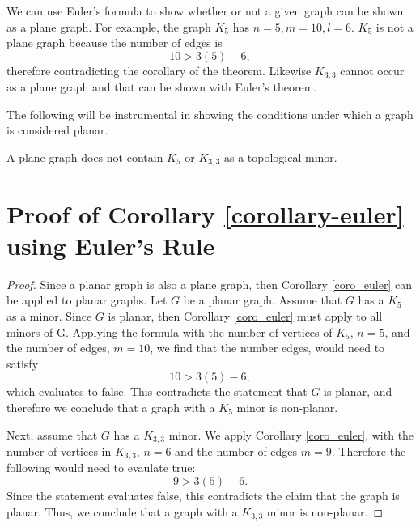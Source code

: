We can use Euler's formula to show whether or not a given graph can be shown as a plane graph. For example, the graph $K_5$ has $n=5, m=10, l=6$. $K_5$ is not a plane graph because the number of edges is 
$$10 > 3(5) - 6,$$
therefore contradicting the corollary of the theorem. Likewise $K_{3,3}$ cannot occur as a plane graph and that can be shown with Euler's theorem.

The following will be instrumental in showing the conditions under which a graph is considered planar.

\begin{corollary}\label{corollary-euler}
A plane graph does not contain $K_5$ or $K_{3,3}$  as a topological minor.
\end{corollary}


\section{Proof of Corollary \ref{corollary-euler} using Euler's Rule}
\begin{proof}
Since a planar graph is also a plane graph, then Corollary \ref{coro_euler} can be applied to planar graphs. Let $G$ be a planar graph. Assume that $G$ has a $K_5$ as a minor. Since $G$ is planar, then Corollary \ref{coro_euler} must apply to all minors of G. Applying the formula with the number of vertices of $K_5$, $n=5$, and the number of edges, $m=10$, we find that the number edges, would need to satisfy
$$10 > 3(5) - 6,$$ which evaluates to false. This contradicts the statement that $G$ is planar, and therefore we conclude that a graph with a $K_5$ minor is non-planar.

Next, assume that $G$ has a $K_{3,3}$ minor. We apply Corollary \ref{coro_euler}, with the number of vertices in $K_{3,3}$, $n=6$ and the number of edges $m=9$. Therefore the following would need to evaulate true:
$$9 > 3(5) - 6.$$
Since the statement evaluates false, this contradicts the claim that the graph is planar. Thus, we conclude that a graph with a $K_{3,3}$ minor is non-planar.
\end{proof}





